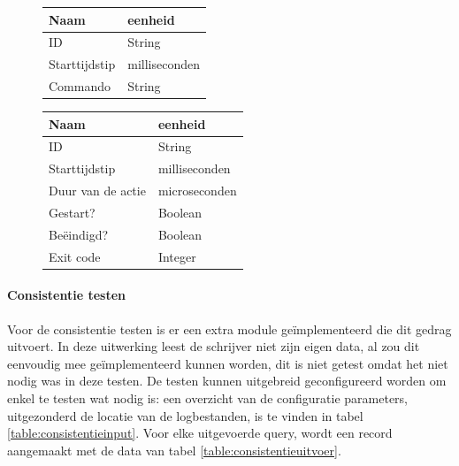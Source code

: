 \begin{figure}[ht!]

\begin{minipage}[b]{0.4\textwidth}
		\begin{tabular}{l|l}
			\textbf{Naam} & \textbf{eenheid} \\ 
			\hline ID & String \\ 
			Starttijdstip & milliseconden \\ 
			Commando & String \\ 
		\end{tabular} 
	\label{table:beschikbaarheidinput}
\end{minipage}
\hfill
\begin{minipage}[b]{0.5\textwidth}

\begin{tabular}{l|l}
\textbf{Naam} & \textbf{eenheid} \\ 
\hline ID & String \\ 
Starttijdstip & milliseconden \\ 
Duur van de actie & microseconden \\
Gestart? & Boolean \\
Beëindigd? & Boolean \\
Exit code & Integer 
\end{tabular}
\label{table:beschikbaarheidoutput}
\end{minipage}
\end{figure}
\paragraph{Consistentie testen} Voor de consistentie testen is er een extra module geïmplementeerd die dit gedrag uitvoert. In deze uitwerking leest de schrijver niet zijn eigen data, al zou dit eenvoudig mee geïmplementeerd kunnen worden, dit is niet getest omdat het niet nodig was in deze testen. De testen kunnen uitgebreid geconfigureerd worden om enkel te testen wat nodig is: een overzicht van de configuratie parameters, uitgezonderd de locatie van de logbestanden, is te vinden in tabel \ref{table:consistentieinput}. Voor elke uitgevoerde query, wordt een record aangemaakt met de data van tabel \ref{table:consistentieuitvoer}. 


